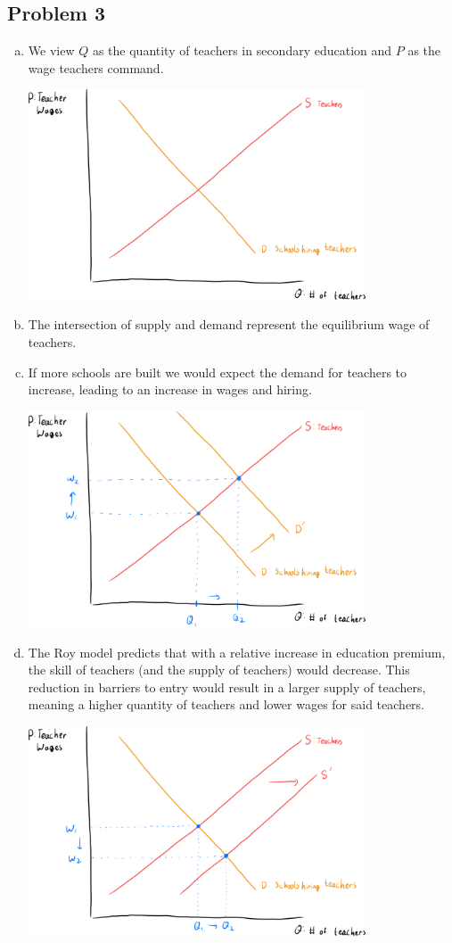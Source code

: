 \documentclass[8pt]{extarticle}
\begin{document}
\subsection{Problem 3}%
\begin{enumerate}[(a)]
  \item We view $Q$ as the quantity of teachers in secondary education and $P$ as the wage teachers command.
    \begin{center}
      \includegraphics[width=10cm]{images/ps2q3a.png}
    \end{center}
  \item The intersection of supply and demand represent the equilibrium wage of teachers.
  \item If more schools are built we would expect the demand for teachers to increase, leading to an increase in wages and hiring.
    \begin{center}
      \includegraphics[width=10cm]{images/ps2q3c.png}
    \end{center}
  \item The Roy model predicts that with a relative increase in education premium, the skill of teachers (and the supply of teachers) would decrease. This reduction in barriers to entry would result in a larger supply of teachers, meaning a higher quantity of teachers and lower wages for said teachers.
    \begin{center}
      \includegraphics[width=10cm]{images/ps2q3d.png}
    \end{center}
\end{enumerate}
\end{document}
